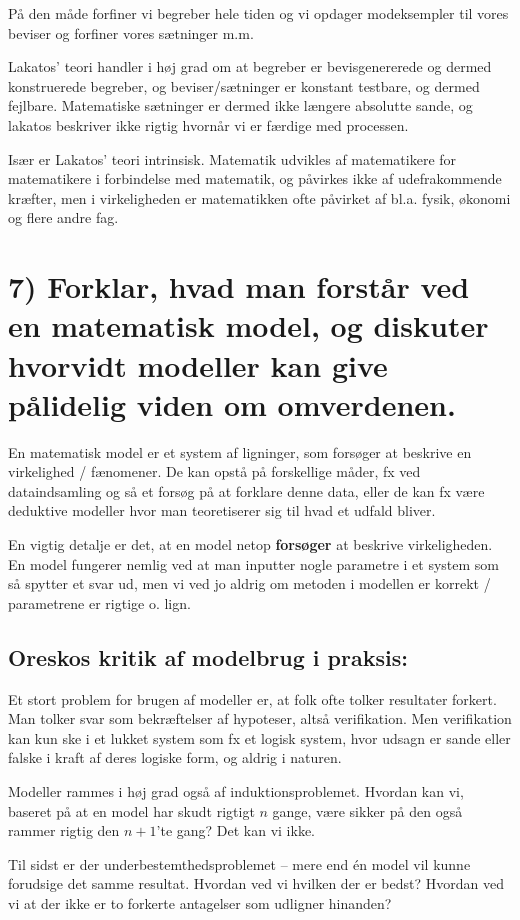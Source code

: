 \documentclass[a4paper,oneside,12pt]{memoir}
\begin{document}
På den måde forfiner vi begreber hele tiden og vi opdager modeksempler til vores beviser og forfiner vores sætninger m.m.

Lakatos' teori handler i høj grad om at begreber er bevisgenererede og dermed konstruerede begreber, og beviser/sætninger er konstant testbare, og dermed fejlbare. Matematiske sætninger er dermed ikke længere absolutte sande, og lakatos beskriver ikke rigtig hvornår vi er færdige med processen.

Især er Lakatos' teori intrinsisk. Matematik udvikles af matematikere for matematikere i forbindelse med matematik, og påvirkes ikke af udefrakommende kræfter, men i virkeligheden er matematikken ofte påvirket af bl.a. fysik, økonomi og flere andre fag.

\section{7) Forklar, hvad man forstår ved en matematisk model, og diskuter hvorvidt modeller kan give pålidelig viden om omverdenen.}
En matematisk model er et system af ligninger, som forsøger at beskrive en virkelighed / fænomener. De kan opstå på forskellige måder, fx ved dataindsamling og så et forsøg på at forklare denne data, eller de kan fx være deduktive modeller hvor man teoretiserer sig til hvad et udfald bliver.

En vigtig detalje er det, at en model netop \textbf{forsøger} at beskrive virkeligheden. En model fungerer nemlig ved at man inputter nogle parametre i et system som så spytter et svar ud, men vi ved jo aldrig om metoden i modellen er korrekt / parametrene er rigtige o. lign.

\subsection{Oreskos kritik af modelbrug i praksis:}
Et stort problem for brugen af modeller er, at folk ofte tolker resultater forkert. Man tolker svar som bekræftelser af hypoteser, altså verifikation. Men verifikation kan kun ske i et lukket system som fx et logisk system, hvor udsagn er sande eller falske i kraft af deres logiske form, og aldrig i naturen. 

Modeller rammes i høj grad også af induktionsproblemet. Hvordan kan vi, baseret på at en model har skudt rigtigt $n$ gange, være sikker på den også rammer rigtig den $n+1$'te gang? Det kan vi ikke.

Til sidst er der underbestemthedsproblemet -- mere end én model vil kunne forudsige det samme resultat. Hvordan ved vi hvilken der er bedst? Hvordan ved vi at der ikke er to forkerte antagelser som udligner hinanden? 
\end{document}
